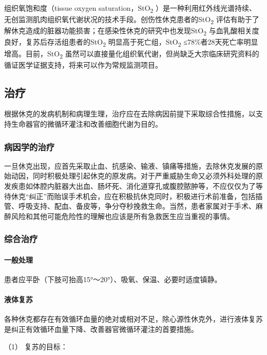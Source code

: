 组织氧饱和度（tissue oxygen saturation，StO\textsubscript{2}
）是一种利用红外线光谱持续、无创监测肌肉组织氧代谢状况的技术手段。创伤性休克患者的StO\textsubscript{2}
评估有助于了解休克造成的脏器功能损害；在感染性休克的研究中也发现StO\textsubscript{2}
与血乳酸相关度良好，复苏后存活组患者的StO\textsubscript{2}
明显高于死亡组，StO\textsubscript{2}
≤78\%者28天死亡率明显增高。目前，StO\textsubscript{2}
虽然可以直接量化组织氧代谢，但尚缺乏大宗临床研究资料的循证医学证据支持，将来可以作为常规监测项目。

\subsection{治疗}

根据休克的发病机制和病理生理，治疗应在去除病因前提下采取综合性措施，以支持生命器官的微循环灌注和改善细胞代谢为目的。

\subsubsection{病因学的治疗}

一旦休克出现，应首先采取止血、抗感染、输液、镇痛等措施，去除休克发展的原始动因，同时积极处理引起休克的原发病。对于严重威胁生命又必须外科处理的原发疾患如体腔内脏器大出血、肠坏死、消化道穿孔或腹腔脓肿等，不应仅仅为了等待休克“纠正”而贻误手术机会，应在积极抗休克同时，积极进行术前准备，包括插管、呼吸支持、配血、备皮等，争分夺秒挽救生命。当然，患者家属对于手术、麻醉风险和其他可能危险性的理解也应该是所有急救医生应当重视的事情。

\subsubsection{综合治疗}

\paragraph{一般处理}

患者应平卧（下肢可抬高15°～20°）、吸氧、保温、必要时适度镇静。

\paragraph{液体复苏}

各种休克都存在有效循环血量的绝对或相对不足，除心源性休克外，进行液体复苏是纠正有效循环血量下降、改善器官微循环灌注的首要措施。

\hypertarget{text00055.htmlux5cux23CHP2-1-3-2-2-1}{}
（1） 复苏的目标：

